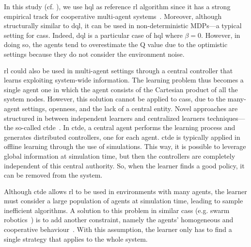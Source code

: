 In this study (cf. ), we use \ac{hql} as reference \ac{rl} algorithm since it has a strong empirical track for cooperative multi-agent systems~\cite{DBLP:journals/ker/MatignonLF12,DBLP:journals/tsmc/XuZLF12,DBLP:journals/asc/BarbaliosT14}. 
%
Moreover, although structurally similar to \ac{dql}, it can be used in non-deterministic MDPs---a typical setting for \acp{cas}. 
%
Indeed, \ac{dql} is a particular case of \ac{hql} where $\beta = 0$. 
%
However, in doing so, the agents tend to overestimate the Q value due to the optimistic settings because they do not consider the environment noise.

\ac{rl} could also be used in multi-agent settings through a central controller that learns exploiting system-wide information. 
%
The learning problem thus becomes a single agent one in which the agent consists of the Cartesian product of all the system nodes. 
%
However, this solution cannot be applied to \acp{cas}, due to the many-agent settings, openness, and the lack of a central entity.
%
Novel approaches are structured in between independent learners and centralized learners techniques---the so-called \ac{ctde}~\cite{DBLP:phd/ethos/Foerster18}.
In \ac{ctde}, a central agent performs the learning process and generates distributed controllers, one for each agent. 
%
\ac{ctde} is typically applied in offline learning through the use of simulations. 
%
This way, it is possible to leverage global information at simulation time, but then the controllers are completely independent of this central authority.  
%
So, when the learner finds a good policy, it can be removed from the system. 

Although \ac{ctde} allows \ac{rl} to be used in environments with many agents, the learner must consider a large population of agents at simulation time, leading to sample inefficient algorithms.
%
A solution to this problem in similar \acp{cas} (e.g. swarm robotics~\cite{DBLP:conf/atal/SosicKZK17}) is to add another constraint, namely the agents' homogeneous and cooperative behaviour~\cite{DBLP:journals/aamas/PanaitL05}. 
%
With this assumption, the learner only has to find a single strategy that applies to the whole system.%
%

